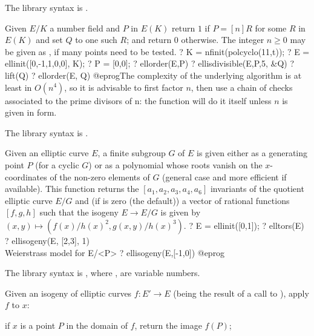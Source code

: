 The library syntax is .

\label{se:ellisdivisible}
Given $E/K$ a number field and $P$ in $E(K)$
return $1$ if $P = [n]R$ for some $R$ in $E(K)$ and set $Q$ to one such $R$;
and return $0$ otherwise. The integer $n \geq 0$ may be given as
, if many points need to be tested.
\bprog
? K = nfinit(polcyclo(11,t));
? E = ellinit([0,-1,1,0,0], K);
? P = [0,0];
? ellorder(E,P)
? ellisdivisible(E,P,5, &Q)
? lift(Q)
? ellorder(E, Q)
@eprog\noindent The complexity of the underlying algorithm is at least in
$O(n^4)$, so it is advisable to first factor $n$, then use a chain of checks
associated to the prime divisors of n: the function will do it itself unless
$n$ is given in  form.

The library syntax is .

\label{se:ellisogeny}
Given an elliptic curve $E$, a finite subgroup $G$ of $E$ is given either
as a generating point $P$ (for a cyclic $G$) or as a polynomial whose roots
vanish on the $x$-coordinates of the non-zero elements of $G$ (general case
and more efficient if available). This function returns the
$[a_1,a_2,a_3,a_4,a_6]$ invariants of the quotient elliptic curve $E/G$ and
(if  is zero (the default)) a vector of rational
functions $[f, g, h]$ such that the isogeny $E \to E/G$ is given by $(x,y)
\mapsto (f(x)/h(x)^2, g(x,y)/h(x)^3)$.
\bprog
? E = ellinit([0,1]);
? elltors(E)
? ellisogeny(E, [2,3], 1)  \\ Weierstrass model for E/<P>
? ellisogeny(E,[-1,0])
@eprog

The library syntax is , where ,  are variable numbers.

\label{se:ellisogenyapply}
Given an isogeny of elliptic curves $f:E'\to E$ (being the result of a call
to ), apply $f$ to $x$:

\item if $x$ is a point $P$ in the domain of $f$, return the image $f(P)$;

